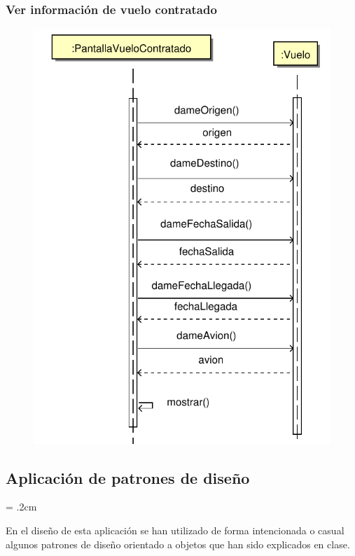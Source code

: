 \documentclass[11pt, a4paper, twoside, titlepage]{article}
\begin{document}
			\subsubsection{Ver información de vuelo contratado}
				\begin{figure}[H]\centering
					\includegraphics[scale=.7]{diagramas/verinfovuelocontratado.pdf}
				\end{figure}

	\subsection{Aplicación de patrones de diseño}
		\parskip = .2cm

		En el diseño de esta aplicación \software se han utilizado de forma intencionada o casual algunos patrones de diseño orientado a objetos que han sido explicados en clase.
\end{document}
